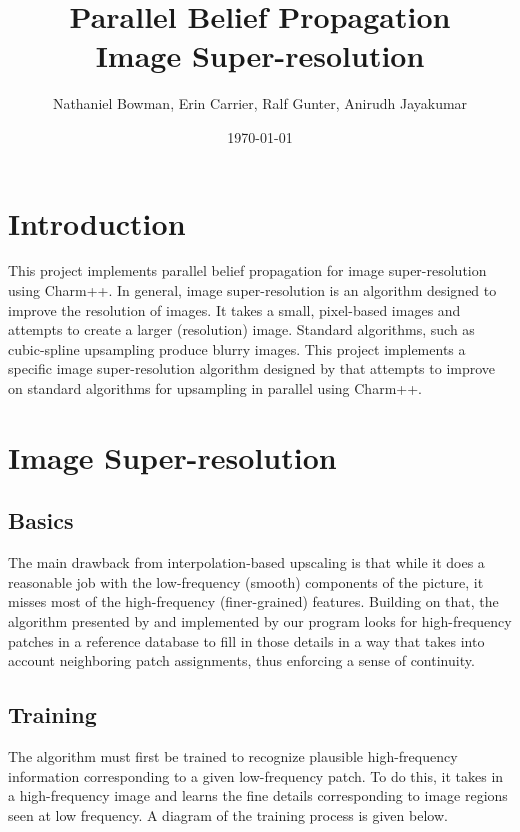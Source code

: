 \documentclass[a4paper]{article}
\title{Parallel Belief Propagation \\ Image Super-resolution}
\author{Nathaniel Bowman, Erin Carrier, Ralf Gunter, Anirudh Jayakumar}
\date{\today}
\begin{document}
\maketitle

\section{Introduction}
This project implements parallel belief propagation for image super-resolution using Charm++.  In general, image super-resolution is an algorithm designed to improve the resolution of images. It takes a small, pixel-based images and attempts to create a larger (resolution) image.  Standard algorithms, such as cubic-spline upsampling produce blurry images.  This project implements a specific image super-resolution algorithm designed by \citet{fjp} that attempts to improve on standard algorithms for upsampling in parallel using Charm++.

\section{Image Super-resolution}

\subsection{Basics}
The main drawback from interpolation-based upscaling is that while it does a reasonable job with the low-frequency (smooth) components of the picture, it misses most of the high-frequency (finer-grained) features. Building on that, the algorithm presented by \citet{fjp} and implemented by our program looks for high-frequency patches in a reference database to fill in those details in a way that takes into account neighboring patch assignments, thus enforcing a sense of continuity.

\subsection{Training}
The algorithm must first be trained to recognize plausible high-frequency information corresponding to a given low-frequency patch.  To do this, it takes in a high-frequency image and learns the fine details corresponding to image regions seen at low frequency. A diagram of the training process is given below.
\end{document}
